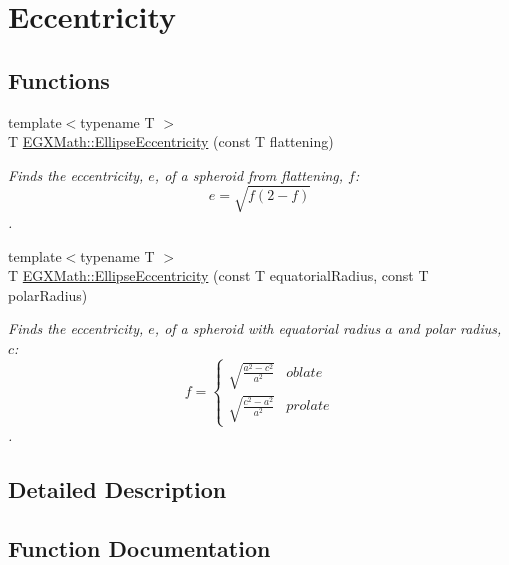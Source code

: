 \hypertarget{group___e_g_x_math-_geometry-2_d-_ellipse-_eccentricity}{}\section{Eccentricity}
\label{group___e_g_x_math-_geometry-2_d-_ellipse-_eccentricity}
\subsection*{Functions}
\begin{DoxyCompactItemize}
\item 
{\footnotesize template$<$typename T $>$ }\\T \mbox{\hyperlink{group___e_g_x_math-_geometry-2_d-_ellipse-_eccentricity_ga6a0a7fba17f782616894cfc447628c33}{E\+G\+X\+Math\+::\+Ellipse\+Eccentricity}} (const T flattening)
\begin{DoxyCompactList}\small\item\em Finds the eccentricity, $e$, of a spheroid from flattening, $f$\+: \[ e = \sqrt{f (2 - f)} \]. \end{DoxyCompactList}\item 
{\footnotesize template$<$typename T $>$ }\\T \mbox{\hyperlink{group___e_g_x_math-_geometry-2_d-_ellipse-_eccentricity_gaa80b9037b15dd74c138e1a24e10111b4}{E\+G\+X\+Math\+::\+Ellipse\+Eccentricity}} (const T equatorial\+Radius, const T polar\+Radius)
\begin{DoxyCompactList}\small\item\em Finds the eccentricity, $e$, of a spheroid with equatorial radius $a$ and polar radius, $c$\+: \[ f =\begin{cases} \sqrt{\frac{a^2-c^2}{a^2}} & oblate \\ \sqrt{\frac{c^2-a^2}{a^2}} & prolate \end{cases} \]. \end{DoxyCompactList}\end{DoxyCompactItemize}


\subsection{Detailed Description}


\subsection{Function Documentation}
\mbox{\label{group___e_g_x_math-_geometry-2_d-_ellipse-_eccentricity_ga6a0a7fba17f782616894cfc447628c33}} 
